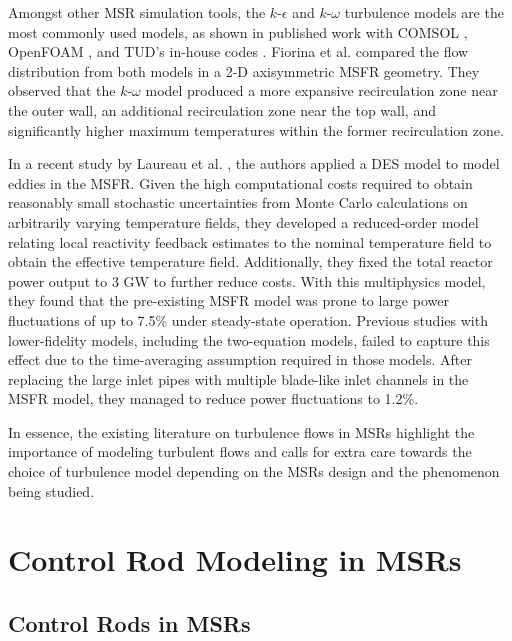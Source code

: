 Amongst other \gls{MSR} simulation tools, the $k$-$\epsilon$ and $k$-$\omega$
turbulence models are the most commonly used models, as shown in published work
with COMSOL \cite{fiorina_modelling_2014}, OpenFOAM
\cite{aufiero_development_2014}, and \gls{TUD}'s in-house codes
\cite{fiorina_modelling_2014,tiberga_results_2020}. Fiorina et al.
\cite{fiorina_modelling_2014} compared the flow distribution from both models
in a 2-D axisymmetric \gls{MSFR} geometry. They observed that the $k$-$\omega$
model produced a more expansive recirculation zone near the outer wall, an additional
recirculation zone near the top wall, and significantly higher maximum
temperatures within the former recirculation zone.

In a recent study by
Laureau et al. \cite{laureau_unmoderated_2022}, the authors applied a \gls{DES} model to model
eddies in the \gls{MSFR}. Given the high computational costs required to obtain reasonably small
stochastic uncertainties from Monte Carlo calculations on arbitrarily varying temperature fields,
they developed a reduced-order model relating local reactivity feedback estimates to the nominal
temperature field to obtain the effective temperature field.
Additionally, they fixed the total
reactor power output to 3 GW to further reduce costs. With this multiphysics model, they found
that the pre-existing \gls{MSFR} model was prone to large power fluctuations of up to 7.5\% under
steady-state operation. Previous studies with lower-fidelity models, including the two-equation
models, failed to capture this effect due to the time-averaging assumption required in those
models. After replacing the large inlet pipes with multiple blade-like inlet channels in the
\gls{MSFR} model, they managed to reduce power fluctuations to 1.2\%.

In essence, the existing literature on turbulence flows in \glspl{MSR} highlight
the importance of modeling turbulent flows and calls for extra care towards the choice of
turbulence model depending on the \glspl{MSR} design and the phenomenon being studied.

\section{Control Rod Modeling in MSRs}

\subsection{Control Rods in MSRs}

